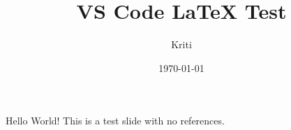 \documentclass{beamer}
\title{VS Code LaTeX Test}
\author{Kriti}
\date{\today}
\begin{document}
\frame{\titlepage}

\begin{frame}{Hello World!}
This is a test slide with no references.
\end{frame}
\end{document}
